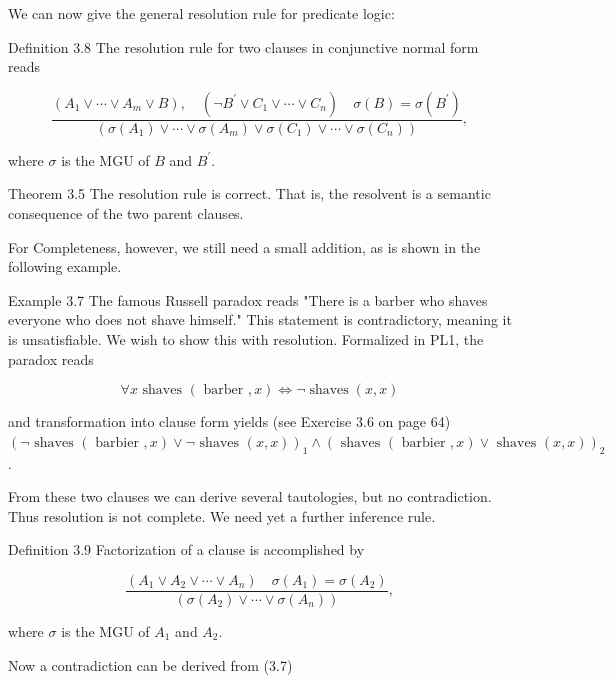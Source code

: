 \documentclass[10pt]{article}
\begin{document}
We can now give the general resolution rule for predicate logic:

Definition 3.8 The resolution rule for two clauses in conjunctive normal form reads


\begin{equation*}
\frac{\left(A_{1} \vee \cdots \vee A_{m} \vee B\right), \quad\left(\neg B^{\prime} \vee C_{1} \vee \cdots \vee C_{n}\right) \quad \sigma(B)=\sigma\left(B^{\prime}\right)}{\left(\sigma\left(A_{1}\right) \vee \cdots \vee \sigma\left(A_{m}\right) \vee \sigma\left(C_{1}\right) \vee \cdots \vee \sigma\left(C_{n}\right)\right)}, \tag{3.6}
\end{equation*}


where $\sigma$ is the MGU of $B$ and $B^{\prime}$.

Theorem 3.5 The resolution rule is correct. That is, the resolvent is a semantic consequence of the two parent clauses.

For Completeness, however, we still need a small addition, as is shown in the following example.


Example 3.7 The famous Russell paradox reads "There is a barber who shaves everyone who does not shave himself." This statement is contradictory, meaning it is unsatisfiable. We wish to show this with resolution. Formalized in PL1, the paradox reads

$$
\forall x \text { shaves }(\text { barber }, x) \Leftrightarrow \neg \operatorname{shaves}(x, x)
$$

and transformation into clause form yields (see Exercise 3.6 on page 64)\\
$(\neg \text { shaves }(\text { barbier }, x) \vee \neg \text { shaves }(x, x))_{1} \wedge(\text { shaves }(\text { barbier }, x) \vee \text { shaves }(x, x))_{2}$.

From these two clauses we can derive several tautologies, but no contradiction. Thus resolution is not complete. We need yet a further inference rule.

Definition 3.9 Factorization of a clause is accomplished by

$$
\frac{\left(A_{1} \vee A_{2} \vee \cdots \vee A_{n}\right) \quad \sigma\left(A_{1}\right)=\sigma\left(A_{2}\right)}{\left(\sigma\left(A_{2}\right) \vee \cdots \vee \sigma\left(A_{n}\right)\right)},
$$

where $\sigma$ is the MGU of $A_{1}$ and $A_{2}$.

Now a contradiction can be derived from (3.7)
\end{document}
